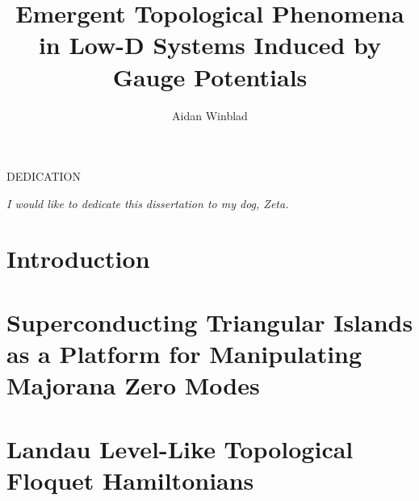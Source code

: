 \documentclass[12pt,doctor]{thesis}
\title{Emergent Topological Phenomena in Low-D Systems Induced by Gauge Potentials}
\author{Aidan Winblad}
\begin{document}
\frontmatter

\maketitle              %
\makemycopyright        %
\makeabstract           %
\makeacknowledgements   %

\begin{flatcenter} %

    DEDICATION

    \vfill %

    \noindent \textit{I would like to dedicate this dissertation to my dog, Zeta.}
    \vfill %
\end{flatcenter}
\newpage

\tableofcontents    %
\listoftables       %
\listoffigures      %

\mainmatter %

\chapter{Introduction}






\chapter{Superconducting Triangular Islands as a Platform for Manipulating Majorana Zero Modes}







\chapter{Landau Level-Like Topological Floquet Hamiltonians}
\end{document}
